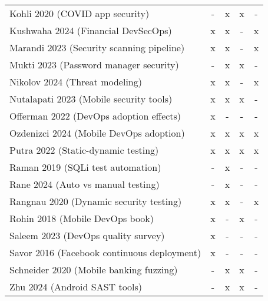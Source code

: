 \documentclass[bscthesis,finnish,oneside,biblatex]{uefcsthesis}
\begin{document}
\begin{table}[htbp]
\begin{tabular}{p{7cm}cccc}
            Kohli 2020 (COVID app security)                 & -              & x                 & x                & -                  \\
            Kushwaha 2024 (Financial DevSecOps)             & x              & x                 & -                & x                  \\
            Marandi 2023 (Security scanning pipeline)       & x              & x                 & -                & x                  \\
            Mukti 2023 (Password manager security)          & -              & x                 & x                & -                  \\
            Nikolov 2024 (Threat modeling)                  & x              & x                 & -                & x                  \\
            Nutalapati 2023 (Mobile security tools)         & x              & x                 & x                & -                  \\
            Offerman 2022 (DevOps adoption effects)         & x              & -                 & -                & -                  \\
            Ozdenizci 2024 (Mobile DevOps adoption)         & x              & x                 & x                & x                  \\
            Putra 2022 (Static-dynamic testing)             & x              & x                 & x                & x                  \\
            Raman 2019 (SQLi test automation)               & -              & x                 & -                & -                  \\
            Rane 2024 (Auto vs manual testing)              & -              & x                 & -                & -                  \\
            Rangnau 2020 (Dynamic security testing)         & x              & x                 & -                & x                  \\
            Rohin 2018 (Mobile DevOps book)                 & x              & -                 & x                & -                  \\
            Saleem 2023 (DevOps quality survey)             & x              & -                 & -                & -                  \\
            Savor 2016 (Facebook continuous deployment)     & x              & -                 & -                & -                  \\
            Schneider 2020 (Mobile banking fuzzing)         & -              & x                 & x                & -                  \\
            Zhu 2024 (Android SAST tools)                   & -              & x                 & x                & -                  \\
            \bottomrule
        \end{tabular}
    \end{table}
\end{document}
